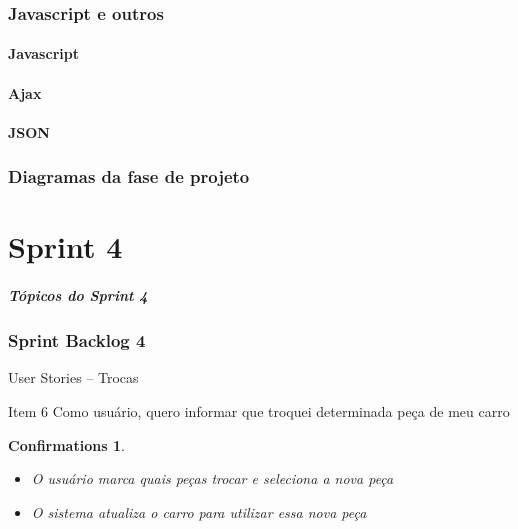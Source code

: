 \documentclass[hyperref={pdfpagelabels=false},11pt]{beamer}
\newtheorem{confirmations}[theorem]{Confirmations}
\begin{document}
		\section{Javascript e outros}
			\subsection{Javascript}
			\subsection{Ajax}
			\subsection{JSON}
		\section{Diagramas da fase de projeto}
		
	\part{Sprint 4}
		
		\begin{frame}
			\frametitle{Tópicos do Sprint 4}
			\tableofcontents[pausesections]
		\end{frame}
			
 		\section{Sprint Backlog 4}
			\begin{frame}{User Stories -- Trocas}
				\begin{block}{Item 6}
					Como usuário, quero informar que troquei determinada peça de meu carro
					\begin{confirmations}
						\begin{itemize}
							\item O usuário marca quais peças trocar e seleciona a nova peça
							\item O sistema atualiza o carro para utilizar essa nova peça
						\end{itemize}
					\end{confirmations}
				\end{block}
			\end{frame}
			
\end{document}
